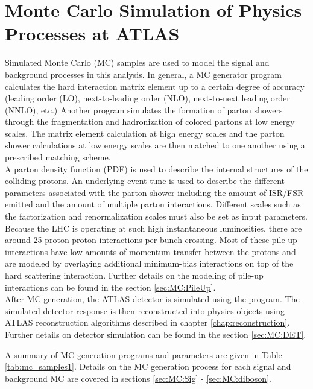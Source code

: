 \chapter{Monte Carlo Simulation of Physics Processes at ATLAS}
\label{chap:MCSimulation}

\indent Simulated Monte Carlo (MC) samples are used to model the signal and background processes in this analysis.  In general, a MC generator program calculates the hard interaction matrix element up to a certain degree of accuracy (leading order (LO), next-to-leading order (NLO), next-to-next leading order (NNLO), etc.)  Another program simulates the formation of parton showers through the fragmentation and hadronization of colored partons at low energy scales.  The matrix element calculation at high energy scales and the parton shower calculations at low energy scales are then matched to one another using a prescribed matching scheme.  \\

\indent A parton density function (PDF) is used to describe the internal structures of the colliding protons. An underlying event tune is used to describe the different parameters associated with the parton shower including the amount of ISR/FSR emitted and the amount of multiple parton interactions. Different scales such as the factorization and renormalization scales must also be set as input parameters.  \\

\indent  Because the LHC is operating at such high instantaneous luminosities, there are around 25 proton-proton interactions per bunch crossing.  Most of these pile-up interactions have low amounts of momentum transfer between the protons and are modeled by overlaying additional minimum-bias interactions on top of the hard scattering interaction.  Further details on the modeling of pile-up interactions can be found in the section \ref{sec:MC:PileUp}. \\

\indent After MC generation, the ATLAS detector is simulated using the  program.\cite{Geant}  The simulated detector response is then reconstructed into physics objects using ATLAS reconstruction algorithms described in chapter \ref{chap:reconstruction}.  Further details on detector simulation can be found in the section \ref{sec:MC:DET}.

\indent A summary of MC generation programs and parameters are given in Table \ref{tab:mc_samples1}.  Details on the MC generation process for each signal and background MC are covered in sections \ref{sec:MC:Sig} - \ref{sec:MC:diboson}.  \\  %


